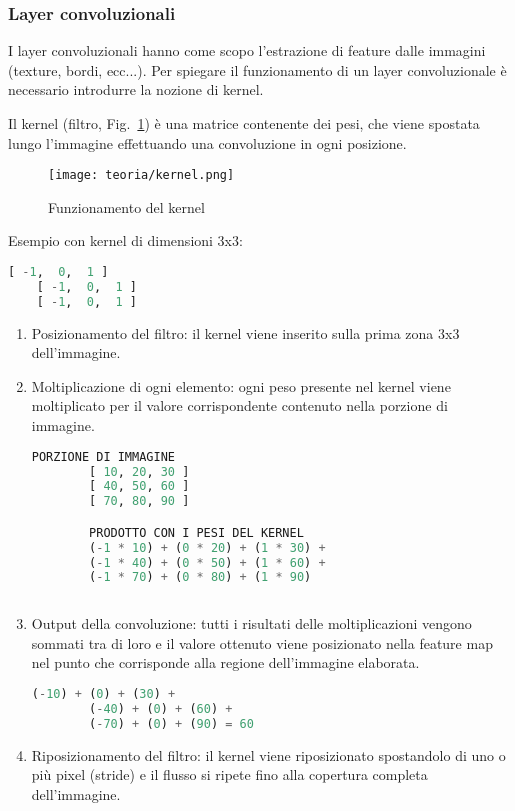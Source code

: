 \subsubsection{Layer convoluzionali}
I layer convoluzionali hanno come scopo l'estrazione di feature dalle immagini (texture, bordi, ecc...).
Per spiegare il funzionamento di un layer convoluzionale è necessario introdurre la nozione di kernel.

Il kernel (filtro, Fig.~\ref{fig:kernel}) è una matrice contenente dei pesi, che viene spostata lungo l'immagine effettuando una convoluzione in ogni posizione.

\begin{figure}[!h] 
    \centering 
    \texttt{[image: teoria/kernel.png]} 
    \caption{Funzionamento del kernel}
    \label{fig:kernel}
  \end{figure}
Esempio con kernel di dimensioni 3x3:

\begin{lstlisting}[language=Python, frame=none]
    [ -1,  0,  1 ]
    [ -1,  0,  1 ]
    [ -1,  0,  1 ]
\end{lstlisting}


\begin{enumerate}
    \item Posizionamento del filtro: il kernel viene inserito sulla prima zona 3x3 dell'immagine.
    \item Moltiplicazione di ogni elemento: ogni peso presente nel kernel viene moltiplicato per il valore corrispondente contenuto nella porzione di immagine.
    \newpage
    \begin{lstlisting}[language=Python, frame=none]
        PORZIONE DI IMMAGINE
        [ 10, 20, 30 ]
        [ 40, 50, 60 ]
        [ 70, 80, 90 ]

        PRODOTTO CON I PESI DEL KERNEL
        (-1 * 10) + (0 * 20) + (1 * 30) +
        (-1 * 40) + (0 * 50) + (1 * 60) +
        (-1 * 70) + (0 * 80) + (1 * 90)
            
    \end{lstlisting}
    \item Output della convoluzione: tutti i risultati delle moltiplicazioni vengono sommati tra di loro e il valore ottenuto viene posizionato nella feature map nel punto che corrisponde alla regione dell'immagine elaborata.
    \begin{lstlisting}[language=Python, frame=none]
        (-10) + (0) + (30) +
        (-40) + (0) + (60) +
        (-70) + (0) + (90) = 60
    \end{lstlisting}
    \item Riposizionamento del filtro: il kernel viene riposizionato spostandolo di uno o più pixel (stride) e il flusso si ripete fino alla copertura completa dell'immagine.
\end{enumerate}

